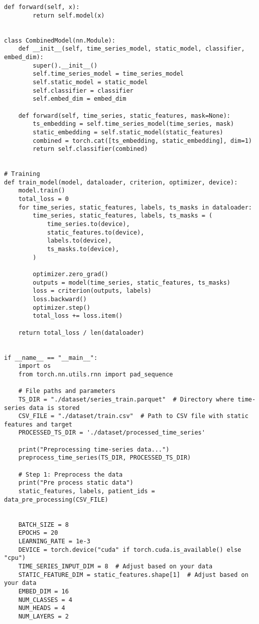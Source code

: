 \begin{appendices}
\begin{mdframed}
\begin{lstlisting}[breaklines=true]
    def forward(self, x):
        return self.model(x)


class CombinedModel(nn.Module):
    def __init__(self, time_series_model, static_model, classifier, embed_dim):
        super().__init__()
        self.time_series_model = time_series_model
        self.static_model = static_model
        self.classifier = classifier
        self.embed_dim = embed_dim

    def forward(self, time_series, static_features, mask=None):
        ts_embedding = self.time_series_model(time_series, mask)
        static_embedding = self.static_model(static_features)
        combined = torch.cat([ts_embedding, static_embedding], dim=1)
        return self.classifier(combined)


# Training
def train_model(model, dataloader, criterion, optimizer, device):
    model.train()
    total_loss = 0
    for time_series, static_features, labels, ts_masks in dataloader:
        time_series, static_features, labels, ts_masks = (
            time_series.to(device),
            static_features.to(device),
            labels.to(device),
            ts_masks.to(device),
        )

        optimizer.zero_grad()
        outputs = model(time_series, static_features, ts_masks)
        loss = criterion(outputs, labels)
        loss.backward()
        optimizer.step()
        total_loss += loss.item()

    return total_loss / len(dataloader)


if __name__ == "__main__":
    import os
    from torch.nn.utils.rnn import pad_sequence

    # File paths and parameters
    TS_DIR = "./dataset/series_train.parquet"  # Directory where time-series data is stored
    CSV_FILE = "./dataset/train.csv"  # Path to CSV file with static features and target
    PROCESSED_TS_DIR = './dataset/processed_time_series'
    
    print("Preprocessing time-series data...")
    preprocess_time_series(TS_DIR, PROCESSED_TS_DIR)
    
    # Step 1: Preprocess the data
    print("Pre process static data")
    static_features, labels, patient_ids = data_pre_processing(CSV_FILE)
    
    
    BATCH_SIZE = 8
    EPOCHS = 20
    LEARNING_RATE = 1e-3
    DEVICE = torch.device("cuda" if torch.cuda.is_available() else "cpu")
    TIME_SERIES_INPUT_DIM = 8  # Adjust based on your data
    STATIC_FEATURE_DIM = static_features.shape[1]  # Adjust based on your data
    EMBED_DIM = 16
    NUM_CLASSES = 4
    NUM_HEADS = 4
    NUM_LAYERS = 2


\end{lstlisting}
\end{mdframed}
\end{appendices}
